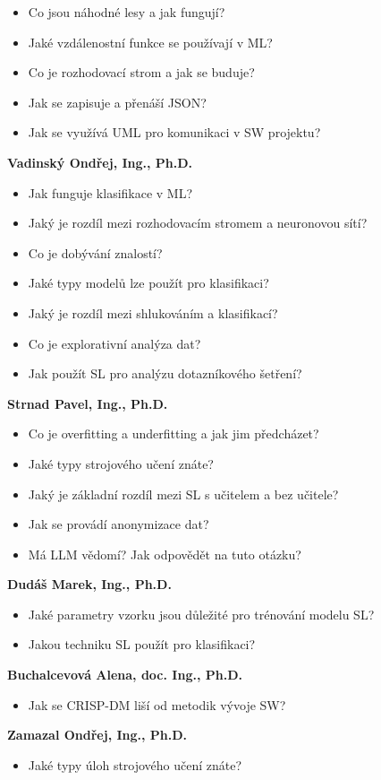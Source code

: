 \begin{profesorbox}
\begin{itemize}
  \item Co jsou náhodné lesy a jak fungují?
  \item Jaké vzdálenostní funkce se používají v ML?
  \item Co je rozhodovací strom a jak se buduje?
  \item Jak se zapisuje a přenáší JSON?
  \item Jak se využívá UML pro komunikaci v SW projektu?
\end{itemize}
\textbf{Vadinský Ondřej, Ing., Ph.D.}
\begin{itemize}
  \item Jak funguje klasifikace v ML?
  \item Jaký je rozdíl mezi rozhodovacím stromem a neuronovou sítí?
  \item Co je dobývání znalostí?
  \item Jaké typy modelů lze použít pro klasifikaci?
  \item Jaký je rozdíl mezi shlukováním a klasifikací?
  \item Co je explorativní analýza dat?
  \item Jak použít SL pro analýzu dotazníkového šetření?
\end{itemize}
\textbf{Strnad Pavel, Ing., Ph.D.}
\begin{itemize}
  \item Co je overfitting a underfitting a jak jim předcházet?
  \item Jaké typy strojového učení znáte?
  \item Jaký je základní rozdíl mezi SL s učitelem a bez učitele?
  \item Jak se provádí anonymizace dat?
  \item Má LLM vědomí? Jak odpovědět na tuto otázku?
\end{itemize}
\textbf{Dudáš Marek, Ing., Ph.D.}
\begin{itemize}
  \item Jaké parametry vzorku jsou důležité pro trénování modelu SL?
  \item Jakou techniku SL použít pro klasifikaci?
\end{itemize}
\textbf{Buchalcevová Alena, doc. Ing., Ph.D.}
\begin{itemize}
  \item Jak se CRISP-DM liší od metodik vývoje SW?
\end{itemize}
\textbf{Zamazal Ondřej, Ing., Ph.D.}
\begin{itemize}
  \item Jaké typy úloh strojového učení znáte?

\end{itemize}
\end{profesorbox}
